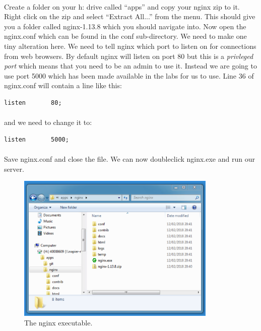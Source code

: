 \documentclass[10pt, a4paper, twosize]{article}
\begin{document}
\paragraph{} Create a folder on your h: drive called ``apps'' and copy your nginx zip to it. Right click on the zip and select ``Extract All...'' from the menu. This should give you a folder called nginx-1.13.8 which you should navigate into. Now open the nginx.conf which can be found in the conf sub-directory. We need to make one tiny alteration here. We need to tell nginx which port to listen on for connections from web browsers. By default nginx will listen on port 80 but this is a \emph{privleged port} which means that you need to be an admin to use it. Instead we are going to use port 5000 which has been made available in the labs for us to use. Line 36 of nginx.conf will contain a line like this:
\begin{lstlisting}[style=DOS]
listen       80;
\end{lstlisting}

\paragraph{} and we need to change it to:

\begin{lstlisting}[style=DOS]
listen       5000;
\end{lstlisting}

\paragraph{} Save nginx.conf and close the file. We can now doubleclick nginx.exe and run our server. 

\begin{figure}[H]
\centering
\includegraphics[width=0.85\textwidth]{images/nginx_exe}
\caption{The nginx executable.}
\label{fig:nginx_welcome}
\end{figure}
\end{document}
